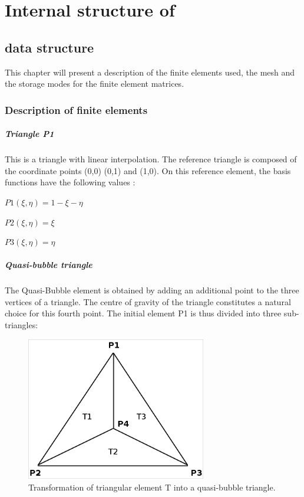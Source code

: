 \chapter{Internal structure of \bief}

\section{\bief data structure}

This chapter will present a description of the finite elements used, the mesh
and the storage modes for the finite element matrices.

\subsection{Description of finite elements}

\paragraph{Triangle P1}

This is a triangle with linear interpolation. The reference triangle is
composed of the coordinate points (0,0)  (0,1)  and  (1,0). On this reference
element, the basis functions have the following values :

$P1(\xi,\eta) = 1 - \xi - \eta$

$P2(\xi,\eta) =     \xi$

$P3(\xi,\eta) =           \eta$

\paragraph{Quasi-bubble triangle}

The Quasi-Bubble element is obtained by adding an additional point to the three
vertices of a triangle. The centre of gravity of the triangle constitutes a
natural choice for this fourth point. The initial element P1 is thus divided
into three sub-triangles:

\begin{figure}[H]%
\begin{center}
%
  \includegraphics[width=0.7\textwidth]{./graphics/quassi-bubble}
%
\end{center}
\caption
{Transformation of triangular element T into a quasi-bubble triangle.}
\label{fig:quassi-bubble}
\end{figure}

